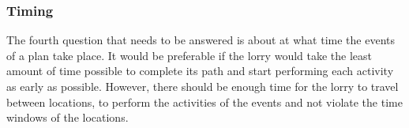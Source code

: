 \subsubsection{Timing }






The fourth question that needs to be answered is about at what time the events of a plan  take place.
It would be preferable if the lorry would take the least amount of time possible to complete its path and start performing each activity as early as possible. 
However, there should be enough time for the lorry to travel between locations,
to perform the activities of the events
and not violate  the time windows of the locations.\\






